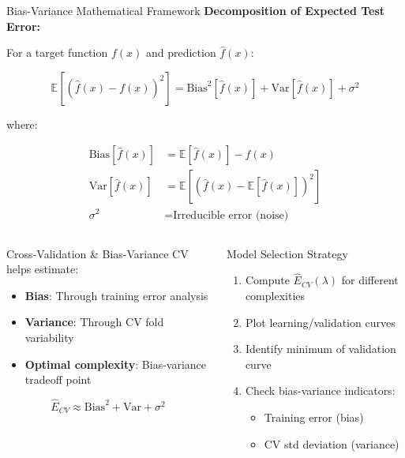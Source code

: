 \documentclass[8pt,aspectratio=1610]{beamer}
\begin{document}
\begin{frame}{Bias-Variance Mathematical Framework}
\textbf{Decomposition of Expected Test Error:}

For a target function $f(x)$ and prediction $\hat{f}(x)$:

$$\mathbb{E}[(\hat{f}(x) - f(x))^2] = \text{Bias}^2[\hat{f}(x)] + \text{Var}[\hat{f}(x)] + \sigma^2$$

where:

\begin{align}
\text{Bias}[\hat{f}(x)] &= \mathbb{E}[\hat{f}(x)] - f(x) \\
\text{Var}[\hat{f}(x)] &= \mathbb{E}[(\hat{f}(x) - \mathbb{E}[\hat{f}(x)])^2] \\
\sigma^2 &= \text{Irreducible error (noise)}
\end{align}

\vspace{0.3cm}

\begin{columns}[t]
\begin{column}{0.48\textwidth}
\begin{block}{Cross-Validation \& Bias-Variance}
CV helps estimate:
\begin{itemize}
\item \textbf{Bias}: Through training error analysis
\item \textbf{Variance}: Through CV fold variability
\item \textbf{Optimal complexity}: Bias-variance tradeoff point
\end{itemize}

$$\hat{E}_{CV} \approx \text{Bias}^2 + \text{Var} + \sigma^2$$
\end{block}
\end{column}

\begin{column}{0.48\textwidth}
\begin{block}{Model Selection Strategy}
\begin{enumerate}
\item Compute $\hat{E}_{CV}(\lambda)$ for different complexities
\item Plot learning/validation curves
\item Identify minimum of validation curve
\item Check bias-variance indicators:
\begin{itemize}
\item Training error (bias)
\item CV std deviation (variance)
\end{itemize}
\end{enumerate}
\end{block}
\end{column}
\end{columns}
\end{frame}
\end{document}
